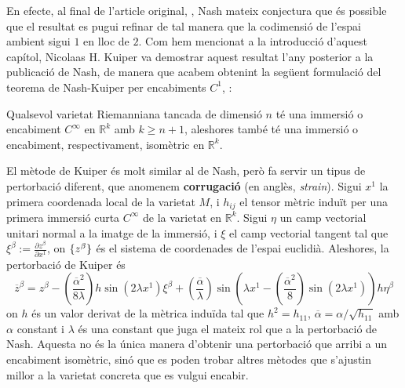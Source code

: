 En efecte, al final de l'article original, \cite{nash1954}, Nash mateix conjectura que és possible que el resultat es pugui refinar de tal manera que la codimensió de l'espai ambient sigui $1$ en lloc de $2$. Com hem mencionat a la introducció d'aquest capítol, Nicolaas H. Kuiper va demostrar aquest resultat l'any posterior a la publicació de Nash, de manera que acabem obtenint la següent formulació del teorema de Nash-Kuiper per encabiments $C^1$, \cite{kuiper1955}:

\begin{teo}
    Qualsevol varietat Riemanniana tancada de dimensió $n$ té una immersió o encabiment $C^\infty$ en $\mathbb R^k$ amb $k\ge n+1$, aleshores també té una immersió o encabiment, respectivament, isomètric en $\mathbb R^k$.
\end{teo}

El mètode de Kuiper és molt similar al de Nash, però fa servir un tipus de pertorbació diferent, que anomenem \textbf{corrugació} (en anglès, \textit{strain}). Sigui $x^1$ la primera coordenada local de la varietat $M$, i $h_{ij}$ el tensor mètric induït per una primera immersió curta $C^\infty$ de la varietat en $\mathbb R^k$. Sigui $\eta$ un camp vectorial unitari normal a la imatge de la immersió, i $\xi$ el camp vectorial tangent tal que $\xi^\beta := \frac{\partial z^\beta}{\partial x^1}$, on $\{z^\beta\}$ és el sistema de coordenades de l'espai euclidià. Aleshores, la pertorbació de Kuiper és
\begin{equation*}
    \boxed{
        \overline{z}^\beta = z^\beta - \left(\frac{\overline \alpha^2}{8\lambda}\right)h\sin\left(2\lambda x^1\right)\xi^\beta + \left(\frac{\overline\alpha}{\lambda}\right)\sin\left(\lambda x^1 - \left(\frac{\overline\alpha ^2}{8}\right)\sin\left(2\lambda x^1\right)\right)h\eta^\beta
        }
\end{equation*}
on $h$ és un valor derivat de la mètrica induïda tal que $h^2 = h_{11}$, $\overline\alpha = \alpha / \sqrt{h_{11}}$ amb $\alpha$ constant i  $\lambda$ és una constant que juga el mateix rol que a la pertorbació de Nash. Aquesta no és la única manera d'obtenir una pertorbació que arribi a un encabiment isomètric, sinó que es poden trobar altres mètodes que s'ajustin millor a la varietat concreta que es vulgui encabir.